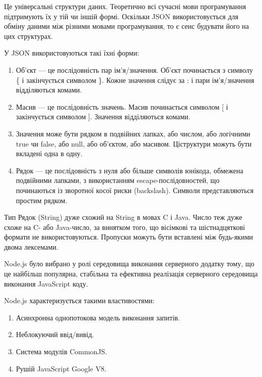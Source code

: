 \documentclass[../main.tex]{subfiles}
\begin{document}
		Це універсальні структури даних. Теоретично всі сучасні мови програмування підтримують їх у тій чи іншій формі. Оскільки JSON використовується для обміну даними між різними мовами програмування, то є сенс будувати його на цих структурах.
		
		У JSON використовуються такі їхні форми:
		\begin{enumerate}
			\item Об'єкт — це послідовність пар ім'я/значення. Об'єкт починається з символу \{ і закінчується символом \}. Кожне значення слідує за : і пари ім'я/значення відділяються комами.
			\item Масив — це послідовність значень. Масив починається символом [ і закінчується символом ]. Значення відділяються комами.
			\item Значення може бути рядком в подвійних лапках, або числом, або логічними true чи false, або null, або об'єктом, або масивом. Ці\nolinebreak[3] структури можуть бути вкладені одна в одну.
			\item Рядок — це послідовність з нуля або більше символів юнікода, обмежена подвійними лапками, з використанням escape-\linebreak[0]послідовностей, що починаються із зворотної косої риски (backslash). Символи представляються простим рядком.
		\end{enumerate}
		
		Тип Рядок (String) дуже схожий на String в мовах C і Java. Число теж дуже схоже на C- або Java-число, за винятком того, що вісімкові та шістнадцяткові формати не використовуються. Пропуски можуть бути вставлені між будь-якими двома лексемами.
		
		Node.js було вибрано у ролі середовища виконання серверного додатку тому, що це найбільш популярна, стабільна та ефективна реалізація серверного середовища виконання JavaScript коду.\pagebreak[2] %
		
		Node.js характеризується такими властивостями:
		\begin{enumerate}
			\item Асинхронна однопотокова модель виконання запитів.
			\item Неблокуючий ввід/вивід.
			\item Система модулів CommonJS.
			\item Рушій JavaScript Google V8.
		\end{enumerate}
		
\end{document}
